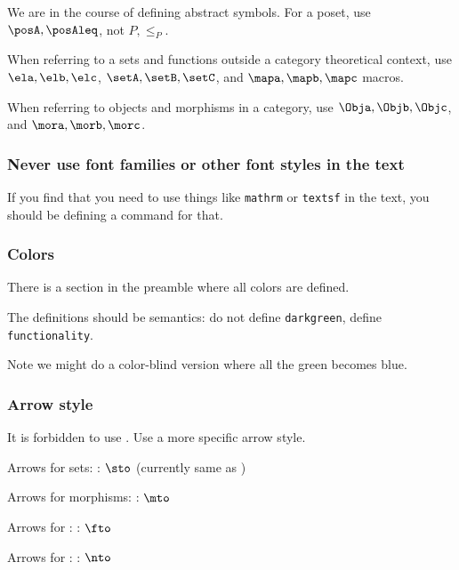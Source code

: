 We are in the course of defining abstract symbols.
For a poset, use $\posA,\posAleq$, not $P,\leq_P$.

When referring to a sets and functions outside a category theoretical context, use $\ela,\elb,\elc$, $\setA,\setB,\setC$, and $\mapa,\mapb,\mapc$ macros.

When referring to objects and morphisms in a category, use $\Obja,\Objb,\Objc$, and $\mora,\morb,\morc$.

\subsubsection*{Never use font families or other font styles in the text}

If you find that you need to use things like \texttt{mathrm} or \texttt{textsf} in the text, you should be defining a command for that.

\subsubsection*{Colors}

There is a section in the preamble where all colors are defined.

The definitions should be semantics: do not define \texttt{darkgreen}, define \texttt{fun\-ctionality}.

Note we might do a color-blind version where all the green becomes blue.

\subsubsection*{Arrow style}

It is forbidden to use \str{\to}.
Use a more specific arrow style.

Arrows for sets: \str{\sto}: $\sto$ (currently same as )

Arrows for morphisms: \str{\mto}: $\mto$

Arrows for : \str{\fto}: $\fto$

Arrows for : \str{\nto}: $\nto$

%
%
%
%

